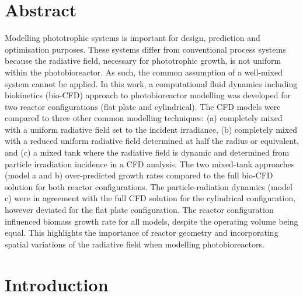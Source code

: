 \section*{Abstract}
Modelling phototrophic systems is important for design, prediction and optimisation purposes. These systems differ from conventional process systems because the radiative field, necessary for phototrophic growth, is not uniform within the photobioreactor. As such, the common assumption of a well-mixed system cannot be applied. In this work, a computational fluid dynamics including biokinetics (bio-CFD) approach to photobioreactor modelling was developed for two reactor configurations (flat plate and cylindrical). The CFD models were compared to three other common modelling techniques: (a) completely mixed with a uniform radiative field set to the incident irradiance, (b) completely mixed with a reduced uniform radiative field determined at half the radius or equivalent, and (c) a mixed tank where the radiative field is dynamic and determined from particle irradiation incidence in a CFD analysis. The two mixed-tank approaches (model a and b) over-predicted growth rates compared to the full bio-CFD solution for both reactor configurations. The particle-radiation dynamics (model c) were in agreement with the full CFD solution for the cylindrical configuration, however deviated for the flat plate configuration. The reactor configuration influenced biomass growth rate for all models, despite the operating volume being equal. This highlights the importance of reactor geometry and incorporating spatial variations of the radiative field when modelling photobioreactors.
\section{Introduction}
\label{sec:ch3_intro}	%


